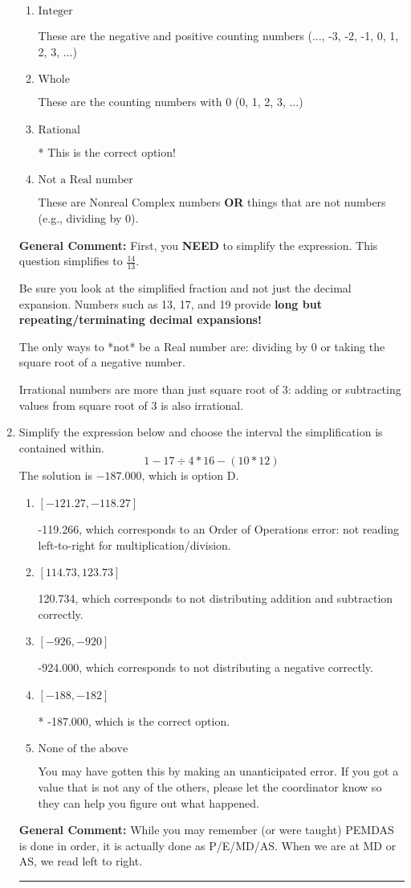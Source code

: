 \documentclass{extbook}[14pt]
\newcommand{\litem}[1]{\item #1

\rule{\textwidth}{0.4pt}}
\begin{document}
\begin{enumerate}
{\begin{enumerate}[label=\Alph*.]
These cannot be written as a fraction of Integers.
\item \( \text{Integer} \)

These are the negative and positive counting numbers (..., -3, -2, -1, 0, 1, 2, 3, ...)
\item \( \text{Whole} \)

These are the counting numbers with 0 (0, 1, 2, 3, ...)
\item \( \text{Rational} \)

* This is the correct option!
\item \( \text{Not a Real number} \)

These are Nonreal Complex numbers \textbf{OR} things that are not numbers (e.g., dividing by 0).
\end{enumerate}

\textbf{General Comment:} First, you \textbf{NEED} to simplify the expression. This question simplifies to $\frac{14}{13}$. 
 
 Be sure you look at the simplified fraction and not just the decimal expansion. Numbers such as 13, 17, and 19 provide \textbf{long but repeating/terminating decimal expansions!} 
 
 The only ways to *not* be a Real number are: dividing by 0 or taking the square root of a negative number. 
 
 Irrational numbers are more than just square root of 3: adding or subtracting values from square root of 3 is also irrational.
}
\litem{
Simplify the expression below and choose the interval the simplification is contained within.
\[ 1 - 17 \div 4 * 16 - (10 * 12) \]The solution is \( -187.000 \), which is option D.\begin{enumerate}[label=\Alph*.]
\item \( [-121.27, -118.27] \)

 -119.266, which corresponds to an Order of Operations error: not reading left-to-right for multiplication/division.
\item \( [114.73, 123.73] \)

 120.734, which corresponds to not distributing addition and subtraction correctly.
\item \( [-926, -920] \)

 -924.000, which corresponds to not distributing a negative correctly.
\item \( [-188, -182] \)

* -187.000, which is the correct option.
\item \( \text{None of the above} \)

 You may have gotten this by making an unanticipated error. If you got a value that is not any of the others, please let the coordinator know so they can help you figure out what happened.
\end{enumerate}

\textbf{General Comment:} While you may remember (or were taught) PEMDAS is done in order, it is actually done as P/E/MD/AS. When we are at MD or AS, we read left to right.
}
\end{enumerate}
\end{document}
